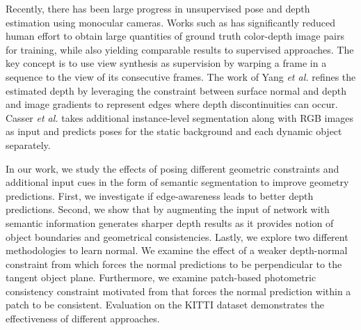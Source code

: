 \documentclass[10pt,twocolumn,letterpaper]{article}
\begin{document}
Recently, there has been large progress in unsupervised pose and depth estimation using monocular cameras. Works such as \cite{zhou2017unsupervised} has significantly reduced human effort to obtain large quantities of ground truth color-depth image pairs for training, while also yielding comparable results to supervised approaches. The key concept is to use view synthesis as supervision by warping a frame in a sequence to the view of its consecutive frames. The work of Yang \textit{et al.}\cite{yang2018lego} refines the estimated depth by leveraging the constraint between surface normal and depth and image gradients to represent edges where depth discontinuities can occur. Casser \textit{et al.}\cite{casser2018depth} takes additional instance-level segmentation along with RGB images as input and predicts poses for the static background and each dynamic object separately. 

In our work, we study the effects of posing different geometric constraints and additional input cues in the form of semantic segmentation to improve geometry predictions. First, we investigate if edge-awareness leads to better depth predictions. Second, we show that by augmenting the input of network with semantic information generates sharper depth results as it provides notion of object boundaries and geometrical consistencies. Lastly, we explore two different methodologies to learn normal. We examine the effect of a weaker depth-normal constraint from \cite{yang2018lego} which forces the normal predictions to be perpendicular to the tangent object plane. Furthermore, we examine patch-based photometric consistency constraint motivated from \cite{furukawa2010accurate} that forces the normal prediction within a patch to be consistent. Evaluation on the KITTI dataset \cite{kitti} demonstrates the effectiveness of different approaches.

\end{document}

